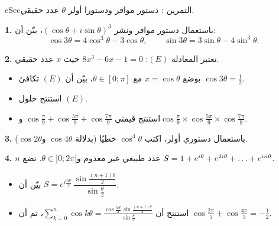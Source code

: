 \documentclass[12pt,a4paper]{article}
\newenvironment{BOX}[2]{\begin{otherlanguage}{english}\begin{arbox}{#1}{#2}}{\end{arbox}\end{otherlanguage}}
\newcounter{exo}
\newenvironment{tamrin}[1]{\stepcounter{exo}\begin{BOX}{cSec}{التمرين \theexo: #1}}{\end{BOX}}
\renewcommand{\dots}{\mathinner{\ldotp\ldotp\ldotp}}
\newenvironment{sq}{\begin{itemize}[leftmargin=2.4em,itemsep=3pt]}{\end{itemize}}
\newcommand{\qa}{\item[(أ)]}\newcommand{\qb}{\item[(ب)]}\newcommand{\qc}{\item[(جـ)]}\newcommand{\qd}{\item[(د)]}\newcommand{\qe}{\item[(هـ)]}
\newcommand{\QQ}[1]{\par\smallskip\textbf{#1.} }
\begin{document}
\begin{tamrin}{دستور موافر ودستورا أولر}
$\theta$ عدد حقيقي.
\QQ{1} باستعمال دستور موافر ونشر $(\cos\theta+i\sin\theta)^3$، بيّن أن:
\[\cos3\theta=4\cos^3\theta-3\cos\theta,\qquad \sin3\theta=3\sin\theta-4\sin^3\theta.\]
\QQ{2} نعتبر المعادلة $(E)$: $8x^3-6x-1=0$ حيث $x$ عدد حقيقي.
\begin{sq}
\qa بوضع $x=\cos\theta$ مع $\theta\in[0;\pi]$، بيّن أن $(E)$ تكافئ $\cos3\theta=\frac12$.
\qb استنتج حلول $(E)$.
\qc استنتج قيمتي $\cos\frac\pi9+\cos\frac{5\pi}9+\cos\frac{7\pi}9$ و$\cos\frac\pi9\times\cos\frac{5\pi}9\times\cos\frac{7\pi}9$.
\end{sq}
\QQ{3} باستعمال دستوري أولر، اكتب $\cos^4\theta$ خطيًا (بدلالة $\cos4\theta$ و$\cos2\theta$).
\QQ{4} $n$ عدد طبيعي غير معدوم و$\theta\in]0;2\pi[$. نضع $S=1+e^{i\theta}+e^{2i\theta}+\dots+e^{in\theta}$.
\begin{sq}
\qa بيّن أن $S=e^{i\frac{n\theta}2}\,\dfrac{\sin\frac{(n+1)\theta}{2}}{\sin\frac\theta2}$.
\qb استنتج أن $\displaystyle\sum_{k=0}^n\cos k\theta=\frac{\cos\frac{n\theta}2\,\sin\frac{(n+1)\theta}2}{\sin\frac\theta2}$، ثم أن $\cos\frac{2\pi}5+\cos\frac{4\pi}5=-\frac12$.
\end{sq}
\end{tamrin}
\end{document}
